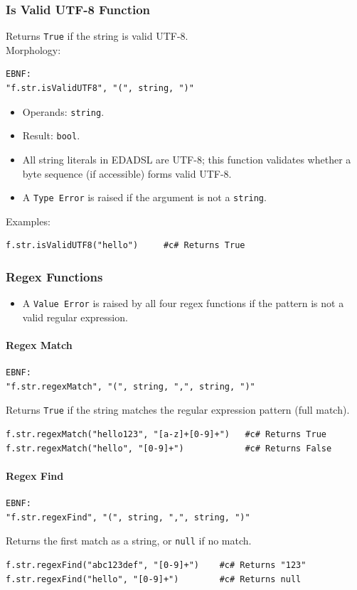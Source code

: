 \subsubsection{Is Valid UTF-8 Function}
Returns \texttt{True} if the string is valid UTF-8. \\
Morphology:
\begin{verbatim}
EBNF:
"f.str.isValidUTF8", "(", string, ")"
\end{verbatim}
\begin{itemize}
\item Operands: \texttt{string}.
\item Result: \texttt{bool}.
\item All string literals in EDADSL are UTF-8; this function validates whether a byte sequence (if accessible) forms valid UTF-8.
\item A \texttt{Type Error} is raised if the argument is not a \texttt{string}.
\end{itemize}
Examples:
\begin{verbatim}
f.str.isValidUTF8("hello")     #c# Returns True
\end{verbatim}

\subsubsection{Regex Functions}
\begin{itemize}
\item A \texttt{Value Error} is raised by all four regex functions if the pattern is not a valid regular expression.
\end{itemize}

\paragraph{Regex Match}
\begin{verbatim}
EBNF:
"f.str.regexMatch", "(", string, ",", string, ")"
\end{verbatim}
Returns \texttt{True} if the string matches the regular expression pattern (full match).
\begin{verbatim}
f.str.regexMatch("hello123", "[a-z]+[0-9]+")   #c# Returns True
f.str.regexMatch("hello", "[0-9]+")            #c# Returns False
\end{verbatim}

\paragraph{Regex Find}
\begin{verbatim}
EBNF:
"f.str.regexFind", "(", string, ",", string, ")"
\end{verbatim}
Returns the first match as a string, or \texttt{null} if no match.
\begin{verbatim}
f.str.regexFind("abc123def", "[0-9]+")    #c# Returns "123"
f.str.regexFind("hello", "[0-9]+")        #c# Returns null
\end{verbatim}

